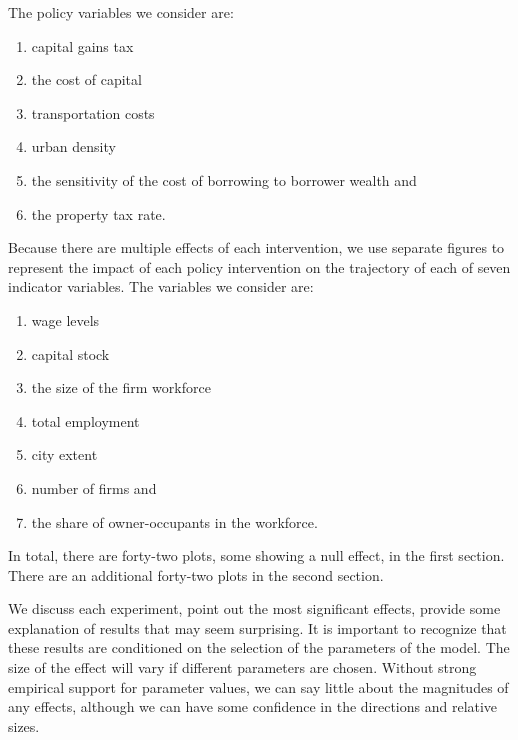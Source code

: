 The policy variables we consider are: 
\begin{enumerate}
\item capital gains tax
\item the cost of capital
\item transportation costs
\item urban density
\item the sensitivity of the cost of borrowing to borrower wealth and
\item the property tax rate.
\end{enumerate}
Because there are multiple effects of each intervention, we use separate figures to represent the impact of each policy intervention on the trajectory of each of seven indicator variables. %
The variables we consider are:
\begin{enumerate}
    \item wage levels
    \item capital stock
    \item the size of the firm workforce
    \item total employment
    \item city extent
    \item number of firms and 
    \item the share of owner-occupants in the workforce.
\end{enumerate} 
In total, there are forty-two plots, some showing a null effect, in the first section. There are an additional forty-two plots in the second section.

We discuss each experiment, point out the most significant effects, provide some explanation of results that may seem surprising.  It is important to recognize that these results are conditioned on the selection of the parameters of the model. The size of the effect will vary if different parameters are chosen. %
Without strong empirical support for parameter values, we can say little about the magnitudes of any effects, although we can have some confidence in the directions and relative sizes. 

